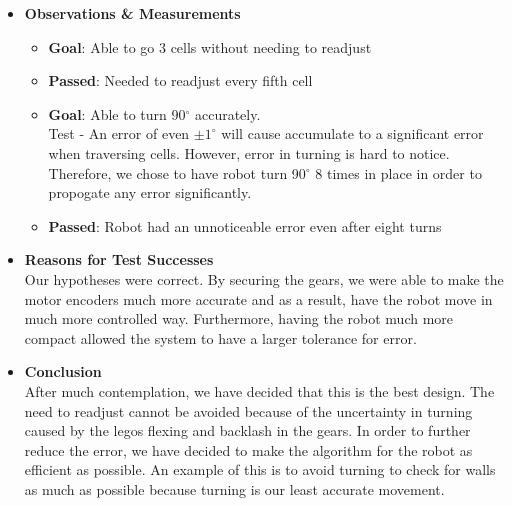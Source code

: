 \documentclass[11pt]{article}
\begin{document}
\begin{itemize}
\item \textbf{Observations \& Measurements}
	\begin{itemize}
	\item \textbf{Goal}: Able to go 3 cells without needing to readjust
 	\item \textbf{Passed}: Needed to readjust every fifth cell
 	\item \textbf{Goal}: Able to turn 90$^{\circ}$ accurately.\\
	Test - An error of even $ \pm 1^{\circ}$ will cause accumulate to a significant error when traversing cells. However, error in turning is hard to notice. Therefore, we chose to have robot turn 90$^{\circ}$ 8 times in place in order to propogate any error significantly. 
	\item \textbf{Passed}: Robot had an unnoticeable error even after eight turns
	\end{itemize}
\item \textbf{Reasons for Test Successes}\\
Our hypotheses were correct. By securing the gears, we were able to make the motor encoders much more accurate and as a result, have the robot move in much more controlled way. Furthermore, having the robot much more compact allowed the system to have a larger tolerance for error.
\item \textbf{Conclusion}\\
After much contemplation, we have decided that this is the best design. The need to readjust cannot be avoided because of the uncertainty in turning caused by the legos flexing and backlash in the gears. In order to further reduce the error, we have decided to make the algorithm for the robot as efficient as possible. An example of this is to avoid turning to check for walls as much as possible because turning is our least accurate movement.
\end{itemize}
\newpage

\end{document}
